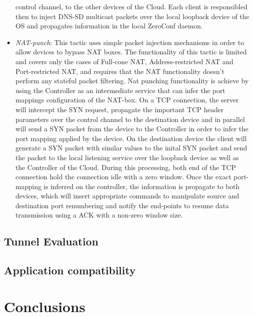 \begin{itemize}
        control channel, to the other devices of the Cloud. Each \signpost
        client is responsibled then to
        inject DNS-SD multicast packets over the local loopback device of the OS
        and propagates information in the local ZeroConf daemon. 
  \item \emph{NAT-punch}: This tactic uses simple packet injection mechanisms in
        order to allow devices to bypass NAT boxes. The
        functionality of this tactic is limited and covers only the cases of
        Full-cone NAT, Address-restricted NAT and Port-restricted NAT, and
        requires that the NAT functionality doesn't perform any stateful packet
        filtering. Nat punching functionality is achieve by using the Controller as
        an intermediate service that can infer the port mappings configuration of
        the NAT-box. On a TCP connection, the server will intercept the SYN
        request, propagate the important TCP header parameters over the control
        channel to the destination device and in parallel will send a SYN packet
        from the device to the Controller in order to infer the port mapping
        applied by the device. On the destination device the \signpost client
        will generate a SYN packet with similar values to the inital SYN packet
        and send the packet to the local listening service over the loopback
        device as well as the Controller of the Cloud. During this processing,
        both end of the TCP connection hold the connection idle with a zero
        window. Once the exact port-mapping is inferred on the controller, the
        information is propagate to both devices, which will insert
        appropriate \of commands to manipulate source and destination port
        renumbering and notify the end-points to resume data transmission using
        a ACK with a non-zero window size.
\end{itemize}

\subsection{Tunnel Evaluation} \label{sec:sp-tactic-eval}

\subsection{Application compatibility}

\section{Conclusions}\label{sec:signpost-conclusion}

